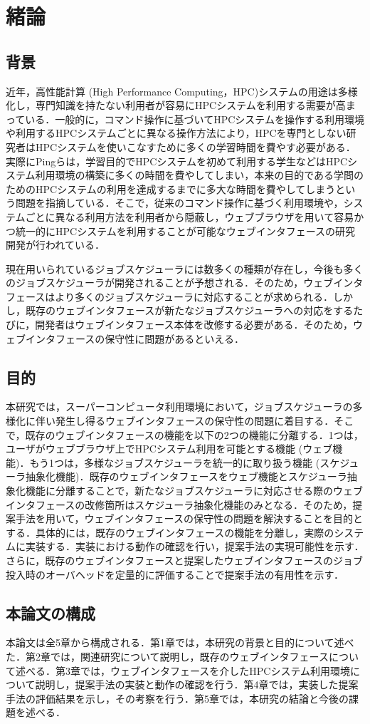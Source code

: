 
\section{緒論}
\subsection{背景}
近年，高性能計算 (High Performance Computing，HPC)システムの用途は多様化し，専門知識を持たない利用者が容易にHPCシステムを利用する需要が高まっている．一般的に，コマンド操作に基づいてHPCシステムを操作する利用環境や利用するHPCシステムごとに異なる操作方法により，HPCを専門としない研究者はHPCシステムを使いこなすために多くの学習時間を費やす必要がある．実際にPingらは，学習目的でHPCシステムを初めて利用する学生などはHPCシステム利用環境の構築に多くの時間を費やしてしまい，本来の目的である学問のためのHPCシステムの利用を達成するまでに多大な時間を費やしてしまうという問題を指摘している\cite{cite1}．そこで，従来のコマンド操作に基づく利用環境や，システムごとに異なる利用方法を利用者から隠蔽し，ウェブブラウザを用いて容易かつ統一的にHPCシステムを利用することが可能なウェブインタフェースの研究開発が行われている\cite{OOD_1}．\par
現在用いられているジョブスケジューラには数多くの種類が存在し，今後も多くのジョブスケジューラが開発されることが予想される．そのため，ウェブインタフェースはより多くのジョブスケジューラに対応することが求められる．しかし，既存のウェブインタフェースが新たなジョブスケジューラへの対応をするたびに，開発者はウェブインタフェース本体を改修する必要がある．そのため，ウェブインタフェースの保守性に問題があるといえる．\par

\subsection{目的}
本研究では，スーパーコンピュータ利用環境において，ジョブスケジューラの多様化に伴い発生し得るウェブインタフェースの保守性の問題に着目する．そこで，既存のウェブインタフェースの機能を以下の2つの機能に分離する．1つは，ユーザがウェブブラウザ上でHPCシステム利用を可能とする機能 (ウェブ機能)．もう1つは，多様なジョブスケジューラを統一的に取り扱う機能 (スケジューラ抽象化機能)．既存のウェブインタフェースをウェブ機能とスケジューラ抽象化機能に分離することで，新たなジョブスケジューラに対応させる際のウェブインタフェースの改修箇所はスケジューラ抽象化機能のみとなる．そのため，提案手法を用いて，ウェブインタフェースの保守性の問題を解決することを目的とする．具体的には，既存のウェブインタフェースの機能を分離し，実際のシステムに実装する．実装における動作の確認を行い，提案手法の実現可能性を示す．さらに，既存のウェブインタフェースと提案したウェブインタフェースのジョブ投入時のオーバヘッドを定量的に評価することで提案手法の有用性を示す．\par

\subsection{本論文の構成}
本論文は全5章から構成される．第1章では，本研究の背景と目的について述べた．第2章では，関連研究について説明し，既存のウェブインタフェースについて述べる．第3章では，ウェブインタフェースを介したHPCシステム利用環境について説明し，提案手法の実装と動作の確認を行う．第4章では，実装した提案手法の評価結果を示し，その考察を行う．第5章では，本研究の結論と今後の課題を述べる．\par
